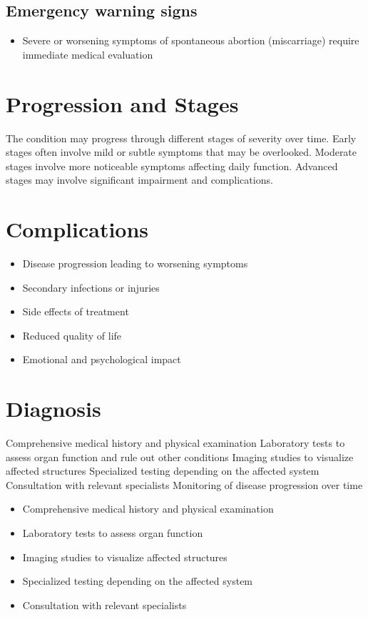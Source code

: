 \subsection{Emergency warning signs}
\begin{itemize}[noitemsep]
  \item Severe or worsening symptoms of spontaneous abortion (miscarriage) require immediate medical evaluation
\end{itemize}
\section{Progression and Stages}
The condition may progress through different stages of severity over time. Early stages often involve mild or subtle symptoms that may be overlooked. Moderate stages involve more noticeable symptoms affecting daily function. Advanced stages may involve significant impairment and complications.
\section{Complications}
\begin{itemize}[noitemsep]
  \item Disease progression leading to worsening symptoms
  \item Secondary infections or injuries
  \item Side effects of treatment
  \item Reduced quality of life
  \item Emotional and psychological impact
\end{itemize}
\section{Diagnosis}
Comprehensive medical history and physical examination Laboratory tests to assess organ function and rule out other conditions Imaging studies to visualize affected structures Specialized testing depending on the affected system Consultation with relevant specialists Monitoring of disease progression over time

\begin{itemize}[noitemsep]
  \item Comprehensive medical history and physical examination
  \item Laboratory tests to assess organ function
  \item Imaging studies to visualize affected structures
  \item Specialized testing depending on the affected system
  \item Consultation with relevant specialists
\end{itemize}
